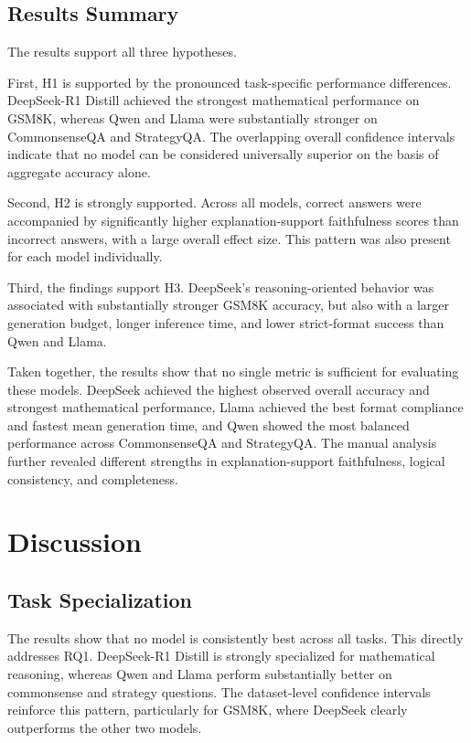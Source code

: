 \documentclass{article}
\begin{document}
\subsection{Results Summary}

The results support all three hypotheses.

First, H1 is supported by the pronounced task-specific performance
differences. DeepSeek-R1 Distill achieved the strongest mathematical
performance on GSM8K, whereas Qwen and Llama were substantially
stronger on CommonsenseQA and StrategyQA. The overlapping overall
confidence intervals indicate that no model can be considered
universally superior on the basis of aggregate accuracy alone.

Second, H2 is strongly supported. Across all models, correct answers
were accompanied by significantly higher explanation-support
faithfulness scores than incorrect answers, with a large overall effect
size. This pattern was also present for each model individually.

Third, the findings support H3. DeepSeek's reasoning-oriented behavior
was associated with substantially stronger GSM8K accuracy, but also
with a larger generation budget, longer inference time, and lower
strict-format success than Qwen and Llama.

Taken together, the results show that no single metric is sufficient
for evaluating these models. DeepSeek achieved the highest observed
overall accuracy and strongest mathematical performance, Llama achieved
the best format compliance and fastest mean generation time, and Qwen
showed the most balanced performance across CommonsenseQA and
StrategyQA. The manual analysis further revealed different strengths
in explanation-support faithfulness, logical consistency, and
completeness.

\section{Discussion}

\subsection{Task Specialization}

The results show that no model is consistently best across all tasks.
This directly addresses RQ1. DeepSeek-R1 Distill is strongly specialized
for mathematical reasoning, whereas Qwen and Llama perform substantially
better on commonsense and strategy questions. The dataset-level
confidence intervals reinforce this pattern, particularly for GSM8K,
where DeepSeek clearly outperforms the other two models.
\end{document}
